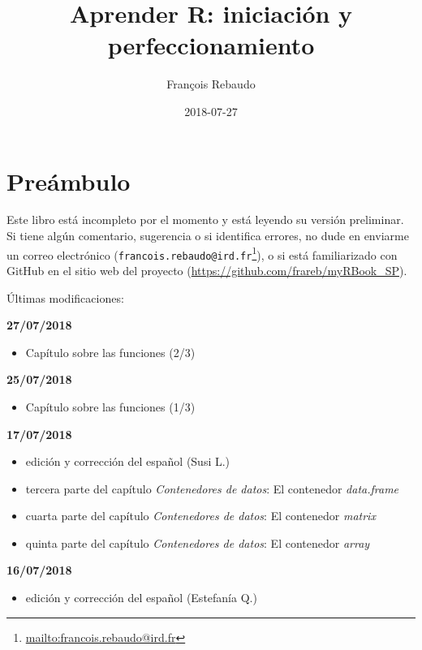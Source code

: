 \documentclass[]{book}
\title{Aprender R: iniciación y perfeccionamiento}
\author{François Rebaudo}
\date{2018-07-27}
\providecommand{\tightlist}{%
  \setlength{\itemsep}{0pt}\setlength{\parskip}{0pt}}
\let\rmarkdownfootnote\footnote%
\def\footnote{\protect\rmarkdownfootnote}
\renewcommand{\href}[2]{#2\footnote{\url{#1}}}
\begin{document}
\maketitle

{
\setcounter{tocdepth}{1}
\tableofcontents
}
\chapter{Preámbulo}\label{preambulo}

Este libro está incompleto por el momento y está leyendo su versión
preliminar. Si tiene algún comentario, sugerencia o si identifica
errores, no dude en enviarme un correo electrónico
(\href{mailto:francois.rebaudo@ird.fr}{\nolinkurl{francois.rebaudo@ird.fr}}),
o si está familiarizado con GitHub en el sitio web del proyecto
(\url{https://github.com/frareb/myRBook_SP}).

Últimas modificaciones:

\textbf{27/07/2018}

\begin{itemize}
\tightlist
\item
  Capítulo sobre las funciones (2/3)
\end{itemize}

\textbf{25/07/2018}

\begin{itemize}
\tightlist
\item
  Capítulo sobre las funciones (1/3)
\end{itemize}

\textbf{17/07/2018}

\begin{itemize}
\tightlist
\item
  edición y corrección del español (Susi L.)
\item
  tercera parte del capítulo \emph{Contenedores de datos}: El contenedor
  \emph{data.frame}
\item
  cuarta parte del capítulo \emph{Contenedores de datos}: El contenedor
  \emph{matrix}
\item
  quinta parte del capítulo \emph{Contenedores de datos}: El contenedor
  \emph{array}
\end{itemize}

\textbf{16/07/2018}

\begin{itemize}
\tightlist
\item
  edición y corrección del español (Estefanía Q.)
\end{itemize}
\end{document}
